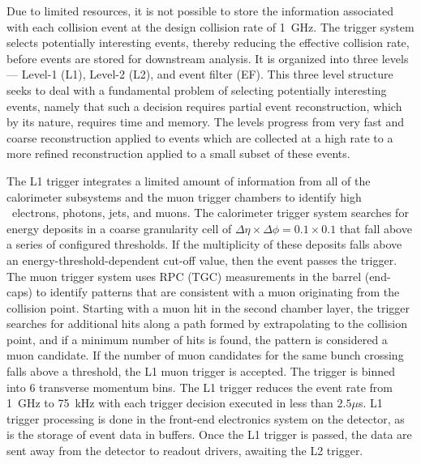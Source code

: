 
Due to limited resources, it is not possible to store the information
associated with each collision event at the design collision rate of
1~GHz. The trigger system selects potentially interesting events,
thereby reducing the effective collision rate, before events are
stored for downstream analysis. It is organized into three levels---
Level-1 (L1), Level-2 (L2), and event filter (EF). This three level
structure seeks to deal with a
fundamental problem of selecting potentially interesting events,
namely that such a decision requires partial event reconstruction,
which by its nature, requires time and memory. The levels progress
from very fast and coarse reconstruction applied to events which are
collected at a high rate to a more refined reconstruction
applied to a small subset of these events. 

The L1 trigger integrates a limited amount of information from all of
the calorimeter
subsystems and the muon trigger chambers to identify high
\et~electrons, photons, jets, and muons. The calorimeter trigger
system searches for energy deposits in a coarse granularity cell of
$\Delta\eta \times \Delta\phi = 0.1 \times 0.1$ that fall above a
series of configured thresholds. If the multiplicity of these deposits
falls above an energy-threshold-dependent cut-off value, then the
event passes the trigger. The muon trigger system uses RPC (TGC)
measurements in the barrel (end-caps) to identify patterns that are
consistent with a muon originating from the collision point. Starting
with a muon hit in the second chamber layer, the trigger searches for
additional hits along a path formed by extrapolating to the collision
point, and if a minimum number of hits is found, the pattern is
considered a muon candidate. If the number of muon candidates for the
same bunch crossing falls above a threshold, the L1 muon trigger is
accepted. The trigger is binned into 6 transverse momentum bins. The
L1 trigger reduces the event rate from 1~GHz to 75~kHz with each
trigger decision executed in less than $2.5 \mu$s. L1 trigger
processing is done in the front-end electronics system on the
detector, as is the storage of event data in buffers. Once the L1
trigger is passed, the data are sent away from the detector to readout
drivers, awaiting the L2 trigger. 

